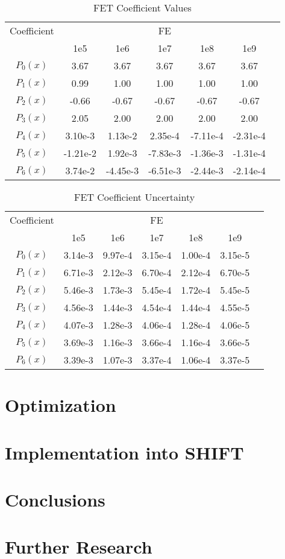 \documentclass[10tma4paper]{article}
\begin{document}
\begin{table}[htbp!]
	\caption{FET Coefficient Values}
	\centering
	\begin{tabular}{c c c c c c c }
		\hline
		Coefficient & &  & FE  &  & & \\[0.5ex]
		 & 1e5 & 1e6 & 1e7 & 1e8 & 1e9 &\\
		 \hline		
		\hline
		$P_{0}(x)$ & 3.67     & 3.67     & 3.67     & 3.67     & 3.67     & \\
		$P_{1}(x)$ & 0.99     & 1.00     & 1.00     & 1.00     & 1.00     & \\
		$P_{2}(x)$ & -0.66    & -0.67    & -0.67    & -0.67    & -0.67    & \\
		$P_{3}(x)$ & 2.05     & 2.00     & 2.00     & 2.00     & 2.00     & \\
		$P_{4}(x)$ & 3.10e-3  & 1.13e-2  & 2.35e-4  & -7.11e-4 & -2.31e-4 & \\
		$P_{5}(x)$ & -1.21e-2 & 1.92e-3  & -7.83e-3 & -1.36e-3 & -1.31e-4 & \\
		$P_{6}(x)$ & 3.74e-2  & -4.45e-3 & -6.51e-3 & -2.44e-3 & -2.14e-4 & \\ [1ex]
		\hline
	\end{tabular}
	\label{table:coef Res}
\end{table}
\begin{table}[htbp!]
	\caption{FET Coefficient Uncertainty}
	\centering
	\begin{tabular}{c c c c c c c }
		\hline
		Coefficient & & & FE & & & \\[0.5ex]
		& 1e5 & 1e6 & 1e7 & 1e8 & 1e9 &\\
		\hline		
		\hline
		$P_{0}(x)$ & 3.14e-3 & 9.97e-4 & 3.15e-4 & 1.00e-4 & 3.15e-5 & \\
		$P_{1}(x)$ & 6.71e-3 & 2.12e-3 & 6.70e-4 & 2.12e-4 & 6.70e-5 & \\
		$P_{2}(x)$ & 5.46e-3 & 1.73e-3 & 5.45e-4 & 1.72e-4 & 5.45e-5 & \\
		$P_{3}(x)$ & 4.56e-3 & 1.44e-3 & 4.54e-4 & 1.44e-4 & 4.55e-5 & \\
		$P_{4}(x)$ & 4.07e-3 & 1.28e-3 & 4.06e-4 & 1.28e-4 & 4.06e-5 & \\
		$P_{5}(x)$ & 3.69e-3 & 1.16e-3 & 3.66e-4 & 1.16e-4 & 3.66e-5 & \\
		$P_{6}(x)$ & 3.39e-3 & 1.07e-3 & 3.37e-4 & 1.06e-4 & 3.37e-5 & \\ [1ex]
		\hline
	\end{tabular}
	\label{table:coef unc Res}
\end{table}

\section{Optimization}\label{optimization}

\section{Implementation into SHIFT}\label{shift}

\section{Conclusions}\label{conclusion}

\section{Further Research}\label{further}
\end{document}
